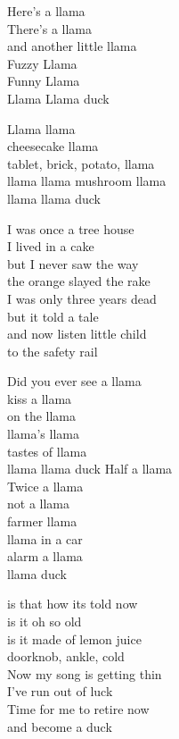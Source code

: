 \vspace{10pt}
Here's a llama\\
There's a llama\\
and another little llama\\
Fuzzy Llama\\
Funny Llama\\
Llama Llama duck\par
\vspace{10pt}
Llama llama\\
cheesecake llama\\
tablet, brick, potato, llama\\
llama llama mushroom llama\\
llama llama duck\par
\vspace{10pt}
I was once a tree house\\
I lived in a cake\\
but I never saw the way\\
the orange slayed the rake\\
I was only three years dead\\
but it told a tale\\
and now listen little child\\
to the safety rail\par
\vspace{10pt}
Did you ever see a llama\\
kiss a llama\\
on the llama\\
llama's llama\\
tastes of llama\\
llama llama duck
\newpage
Half a llama\\
Twice a llama\\
not a llama\\
farmer llama\\
llama in a car\\
alarm a llama\\
llama duck\par
\vspace{10pt}
is that how its told now\\
is it oh so old\\
is it made of lemon juice\\
doorknob, ankle, cold\\
Now my song is getting thin\\
I've run out of luck\\
Time for me to retire now\\
and become a duck
